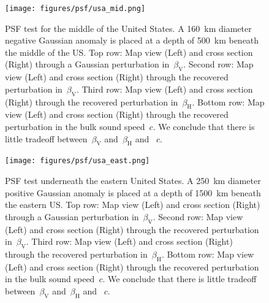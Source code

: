 \documentclass[extra,mreferee]{gji}
\begin{document}
\begin{figure}
  \centering
  \texttt{[image: figures/psf/usa\_mid.png]}
  \caption{\small{PSF test for the middle of the United States.
    A 160~km diameter negative Gaussian anomaly is placed at a depth of 500~km beneath the middle of the US.
  Top row: Map view (Left) and cross section (Right) through a Gaussian perturbation in~$\beta_\mathrm{V}$.
  Second row: Map view (Left) and cross section (Right) through the recovered perturbation in~$\beta_\mathrm{V}$.
  Third row: Map view (Left) and cross section (Right) through the recovered perturbation in~$\beta_\mathrm{H}$.
  Bottom row: Map view (Left) and cross section (Right) through the recovered perturbation in the bulk sound speed~$c$. We conclude that there is little tradeoff between~$\beta_\mathrm{V}$ and~$\beta_\mathrm{H}$ and ~$c$.
  }}
  \label{fig:psf_usa_mid}
\end{figure}


\begin{figure}
  \centering
  \texttt{[image: figures/psf/usa\_east.png]}
  \caption{\small{PSF test underneath the eastern United States.
    A 250~km diameter positive Gaussian anomaly is placed at a depth of 1500~km beneath the eastern US.
  Top row: Map view (Left) and cross section (Right) through a Gaussian perturbation in~$\beta_\mathrm{V}$.
  Second row: Map view (Left) and cross section (Right) through the recovered perturbation in~$\beta_\mathrm{V}$.
  Third row: Map view (Left) and cross section (Right) through the recovered perturbation in~$\beta_\mathrm{H}$.
  Bottom row: Map view (Left) and cross section (Right) through the recovered perturbation in the bulk sound speed~$c$. We conclude that there is little tradeoff between~$\beta_\mathrm{V}$ and~$\beta_\mathrm{H}$ and ~$c$.
  }}
  \label{fig:psf_usa_east}
\end{figure}
\end{document}
